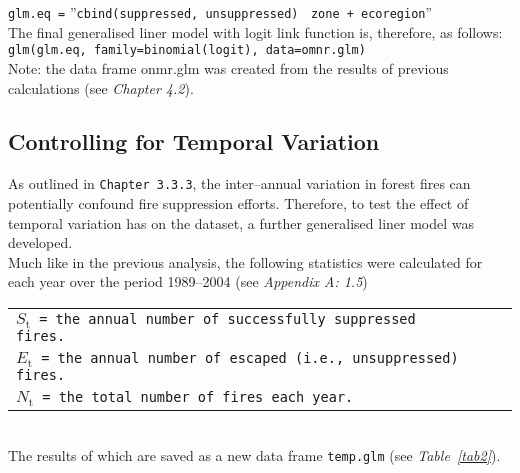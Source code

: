\begin{spacing}{1.5}
\texttt{glm.eq =} ''\texttt{cbind(suppressed, unsuppressed)} $~$ \texttt{zone + ecoregion}'' \\

\noindent The final generalised liner model with logit link function is, therefore, as follows: \\

\texttt{glm(glm.eq, family=binomial(logit), data=omnr.glm) }\\

\noindent Note: the data frame onmr.glm was created from the results of previous calculations (see \emph{Chapter 4.2}). \\

\subsection{Controlling for Temporal Variation}

As outlined in \texttt{Chapter 3.3.3}, the inter--annual variation in forest fires can potentially confound fire suppression efforts. Therefore, to test the effect of temporal variation has on the dataset, a further generalised liner model was developed. \\

Much like in the previous analysis, the following statistics were calculated for each year over the period 1989--2004 (see \emph{Appendix A: 1.5}) \\

\begin{tabular}{lll}
\texttt{$S_{\mathrm{t}}$  = the annual number of successfully suppressed fires.} \\
\texttt{$E_{\mathrm{t}}$  = the annual number of escaped (i.e., unsuppressed) fires.} \\
\texttt{$N_{\mathrm{t}}$  = the total number of fires each year.} \\
\end{tabular}\\

\noindent The results of which are saved as a new data frame \texttt{temp.glm} (see \emph{Table~\ref{tab2}}).



\end{spacing}
